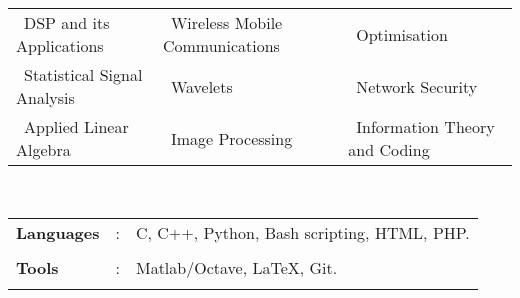 \documentclass[10pt]{article}
\newcommand\hs{1.3mm}		%
\begin{document}
 	
		\begin{tabular}{ l l l }
		\hspace{0.55cm}\textbullet\ DSP and its Applications &  \textbullet\ Wireless Mobile Communications  & \textbullet\ Optimisation \\
		\hspace{0.55cm}\textbullet\ Statistical Signal Analysis & \textbullet\ Wavelets & \textbullet\ Network Security \\
		\hspace{0.55cm}\textbullet\ Applied Linear Algebra & \textbullet\ Image Processing & \textbullet\  Information Theory and Coding\\
	\end{tabular}
	
	
	
	
\colorbox{bl}{}\\
\begin{tabular}{m{1in}m{0.20in}m{4.5in}}
	\\[-3mm]
	\hspace{\hs} \hspace{0.12cm}\textbf{\textbf{Languages}} &: & {{C, C++, Python, Bash scripting, HTML, PHP.}} \\
	\\[-3.5mm]
	\hspace{\hs} \hspace{0.12cm}\textbf{\textbf{Tools}} &: & {Matlab/Octave, \LaTeX, Git.}\\
	\\[-4mm]
\end{tabular}\\



\colorbox{bl}{}
\end{document}
